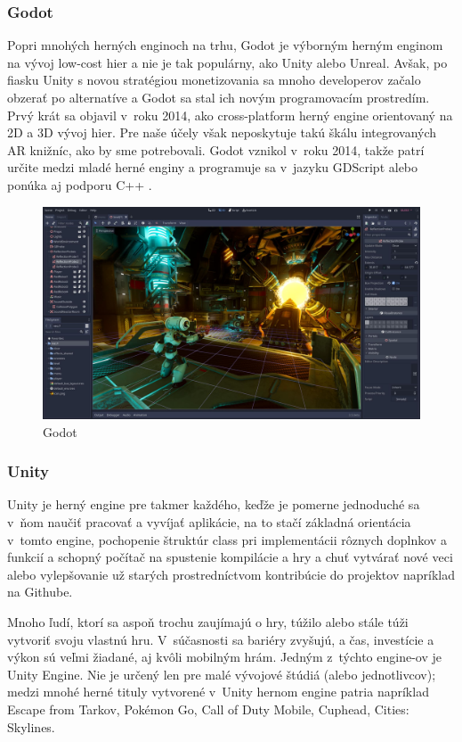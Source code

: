 \subsubsection{Godot}

Popri mnohých herných enginoch na trhu, Godot je výborným herným enginom na vývoj low-cost hier a nie je tak populárny, ako Unity alebo Unreal. Avšak, po fiasku Unity s novou stratégiou monetizovania sa mnoho developerov začalo obzerať po alternatíve a Godot sa stal ich novým programovacím prostredím. Prvý krát sa objavil v~roku 2014, ako cross-platform herný engine orientovaný na 2D a 3D vývoj hier. Pre naše účely však neposkytuje takú škálu integrovaných AR knižníc, ako by sme potrebovali. Godot vznikol v~roku 2014, takže patrí určite medzi mladé herné enginy a programuje sa v~jazyku GDScript alebo ponúka aj podporu C++ \cite{zenva2023godot}. 

\begin{figure}[h]
\centering
\includegraphics[width=1\textwidth]{img/godot_editor.jpg}
\caption{Godot \cite{godottps}}
\label{fig:godotEditor}
\end{figure}

\subsubsection{Unity}

Unity je herný engine pre takmer každého, keďže je pomerne jednoduché sa v~ňom naučiť pracovať a vyvíjať aplikácie, na to stačí základná orientácia v~tomto engine, pochopenie štruktúr class pri implementácii rôznych doplnkov a funkcií a schopný počítač na spustenie kompilácie a hry a chuť vytvárať nové veci alebo vylepšovanie už starých prostredníctvom kontribúcie do projektov napríklad na Githube.

Mnoho ľudí, ktorí sa aspoň trochu zaujímajú o hry, túžilo alebo stále túži vytvoriť svoju vlastnú hru. V~súčasnosti sa bariéry zvyšujú, a čas, investície a výkon sú veľmi žiadané, aj kvôli mobilným hrám. Jedným z~týchto engine-ov je Unity Engine. Nie je určený len pre malé vývojové štúdiá (alebo jednotlivcov); medzi mnohé herné tituly vytvorené v~Unity hernom engine patria napríklad Escape from Tarkov, Pokémon Go, Call of Duty Mobile, Cuphead, Cities: Skylines.%

